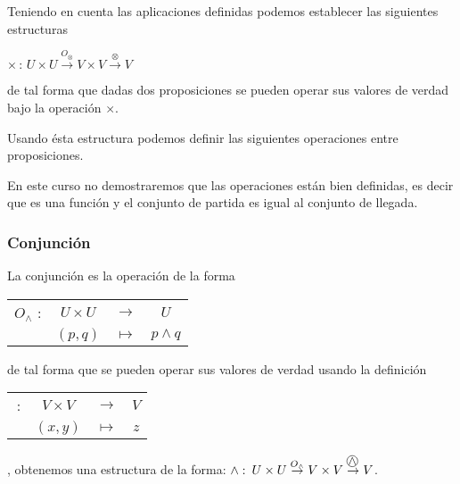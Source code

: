 Teniendo en cuenta las aplicaciones definidas podemos establecer las
siguientes estructuras 

\begin{center}
\begin{large}
  \end{large}
  \end{center}



\begin{center} $\times\,:\, U\times U\overset{O_{\otimes}}{\rightarrow}V\times V\overset{\otimes}{\rightarrow}V$
\end{center}

de tal forma que dadas dos proposiciones se pueden operar sus valores
de verdad bajo la operación $\times$.

Usando ésta estructura podemos definir las siguientes operaciones
entre proposiciones.

\nota En este curso no demostraremos que las operaciones están bien
definidas, es decir que es una función y el conjunto de partida es
igual al conjunto de llegada.




\subsubsection{Conjunción}

La conjunción es la operación de la forma %
\begin{tabular}{cccc}
$O_{\wedge}$ : & $U\times U$ & $\rightarrow$ & %
$U$%
\tabularnewline
 & $\left(p,q\right)$ & $\mapsto$ & $p\wedge q$\tabularnewline
\end{tabular}de tal forma que se pueden operar sus valores de verdad usando la
definición %
\begin{tabular}{cccc}
\oper{$\wedge$}\,: & $V\times V$ & $\rightarrow$ & %
$V$%
\tabularnewline
 & $\left(x,y\right)$ & $\mapsto$ & $z$\tabularnewline
\end{tabular}, obtenemos una estructura de la forma: $\wedge:\: U\times U\overset{O_{\wedge}}{\rightarrow}V\times V\overset{\oper{\ensuremath{\wedge}}\,}{\rightarrow}V$.

